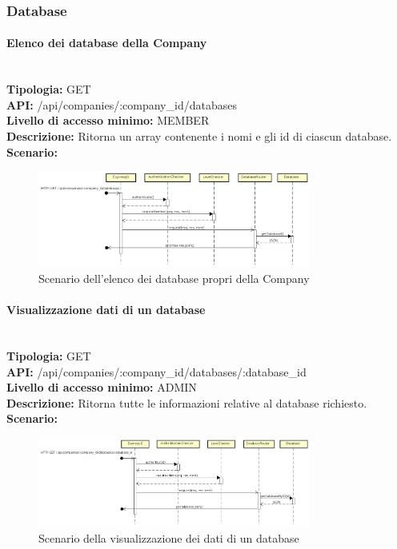 \newpage
\subsubsection{Database}
\paragraph{Elenco dei database della Company}\mbox{}\\
\textbf{Tipologia:} GET \\
\textbf{API:} /api/companies/:company\_id/databases \\
\textbf{Livello di accesso minimo:} MEMBER \\
\textbf{Descrizione:} Ritorna un array contenente i nomi e gli id di ciascun database. \\
\textbf{Scenario:}
\begin{figure}[H]
\centering
\includegraphics[width=0.8\textwidth]{res/sections/backend/sequence/(GET)database.png}
\caption{Scenario dell'elenco dei database propri della Company}
\end{figure}

\newpage
\paragraph{Visualizzazione dati di un database}\mbox{}\\
\textbf{Tipologia:} GET \\
\textbf{API:} /api/companies/:company\_id/databases/:database\_id \\
\textbf{Livello di accesso minimo:} ADMIN \\
\textbf{Descrizione:} Ritorna tutte le informazioni relative al database richiesto. \\
\textbf{Scenario:} 
\begin{figure}[H]
\centering
\includegraphics[width=0.8\textwidth]{res/sections/backend/sequence/(GET)databaseById.png}
\caption{Scenario della visualizzazione dei dati di un database}
\end{figure}

